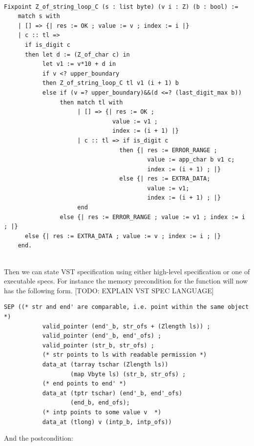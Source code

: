 \documentclass[acmsmall,nonacm]{acmart}
\begin{document}
 \begin{lstlisting}[language=Coq]
 
Fixpoint Z_of_string_loop_C (s : list byte) (v i : Z) (b : bool) := 
    match s with 
    | [] => {| res := OK ; value := v ; index := i |}
    | c :: tl => 
      if is_digit c
      then let d := (Z_of_char c) in 
           let v1 := v*10 + d in
           if v <? upper_boundary 
           then Z_of_string_loop_C tl v1 (i + 1) b
           else if (v =? upper_boundary)&&(d <=? (last_digit_max b))
                then match tl with
                     | [] => {| res := OK ; 
                               value := v1 ; 
                               index := (i + 1) |}
                     | c :: tl => if is_digit c
                                 then {| res := ERROR_RANGE ;
                                         value := app_char b v1 c;
                                         index := (i + 1) ; |}
                                 else {| res := EXTRA_DATA;
                                         value := v1;
                                         index := (i + 1) ; |}
                     end
                else {| res := ERROR_RANGE ; value := v1 ; index := i ; |}      
      else {| res := EXTRA_DATA ; value := v ; index := i ; |}              
    end.
    
 \end{lstlisting}

Then we can state VST specification using either high-level specification or one of executable specs. For instance the memory precondition for the function will now has the following form. [TODO: EXPLAIN VST SPEC LANGUAGE]
\begin{lstlisting}[language=Coq]
SEP ((* str and end' are comparable, i.e. point within the same object *)
           valid_pointer (end'_b, str_ofs + (Zlength ls)) ;
           valid_pointer (end'_b, end'_ofs) ;
           valid_pointer (str_b, str_ofs) ;
           (* str points to ls with readable permission *)
           data_at (tarray tschar (Zlength ls)) 
                   (map Vbyte ls) (str_b, str_ofs) ; 
           (* end points to end' *)
           data_at (tptr tschar) (end'_b, end'_ofs) 
                   (end_b, end_ofs);
           (* intp points to some value v  *)
           data_at (tlong) v (intp_b, intp_ofs))
           \end{lstlisting}

And the postcondition:
           
\end{document}
